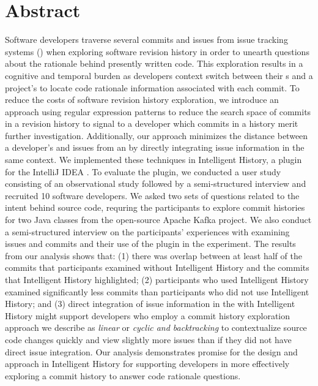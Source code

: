 
\chapter{Abstract}


Software developers traverse several commits and issues from issue tracking systems ()
when exploring software revision history in order to unearth questions about the rationale behind presently written code.
This exploration results in a cognitive and temporal burden as developers
context switch between their s and a project's  to locate code rationale information
associated with each commit.
To reduce the costs of software revision history exploration,
we introduce an approach using regular expression patterns to reduce the search space of commits in a revision history to signal to a developer which commits in a history merit further investigation.
Additionally, our approach minimizes the distance between a developer's  and issues from an 
by directly integrating issue information in the same context.
We implemented these techniques in Intelligent History, a plugin for the IntelliJ IDEA .
To evaluate the plugin, we conducted a user study consisting of an observational 
study followed by a semi-structured interview and recruited 10 software developers.
We asked two sets of questions related to the intent behind source code, requring the participants to explore 
commit histories for two Java classes from the open-source Apache Kafka project.
We also conduct a semi-structured interview on the participants' experiences with examining issues and commits 
and their use of the plugin in the experiment.
The results from our analysis shows that:
(1) there was overlap between at least half of the commits
that participants examined without Intelligent History and the commits that Intelligent History
highlighted; (2) participants who used Intelligent History examined significantly
less commits than participants who did not use Intelligent History;
and (3) direct integration of issue information in the 
with Intelligent History might support developers who employ a commit history exploration approach
we describe as \textit{linear} or \textit{cyclic and backtracking} to contextualize
source code changes quickly and view slightly more issues than if they did not have
direct issue integration.
Our analysis demonstrates promise for the design and approach in Intelligent History
for supporting developers in more effectively exploring a commit history to answer code rationale questions.

